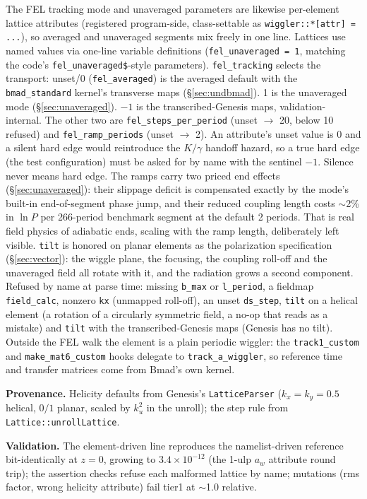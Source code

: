 \documentclass[11pt]{article}
\newcommand{\code}[1]{\texttt{#1}}
\newenvironment{provenance}{\par\small\textbf{Provenance.}}{\par}
\newenvironment{validation}{\par\small\textbf{Validation.}}{\par}
\begin{document}
The FEL tracking mode and unaveraged parameters are likewise per-element lattice
attributes (registered program-side, class-settable as
\code{wiggler::*[attr] = ...}), so averaged and unaveraged segments mix freely in one
line. Lattices use named values via one-line variable definitions
(\code{fel\_unaveraged = 1}, matching the code's \code{fel\_unaveraged\$}-style
parameters). \code{fel\_tracking} selects the transport: unset/0
(\code{fel\_averaged}) is the averaged
default with the
\code{bmad\_standard} kernel's transverse maps (\S\ref{sec:undbmad}). 1 is the
unaveraged mode (\S\ref{sec:unaveraged}). $-1$ is the transcribed-Genesis maps,
validation-internal. The other two are \code{fel\_steps\_per\_period} (unset $\to$ 20,
below 10 refused) and \code{fel\_ramp\_periods} (unset $\to$ 2). An attribute's unset
value
is 0 and a silent hard edge would reintroduce the $K/\gamma$ handoff hazard, so a
true hard edge (the test configuration) must be asked for by name with the
sentinel $-1$. Silence never means hard edge. The ramps carry two priced end
effects (\S\ref{sec:unaveraged}): their slippage deficit is compensated exactly by
the mode's built-in end-of-segment phase jump, and their reduced coupling length
costs $\sim$2\% in $\ln P$ per 266-period benchmark segment at the default 2
periods. That is real field physics of adiabatic ends, scaling with the ramp length,
deliberately left visible. \code{tilt} is honored on planar elements as the polarization specification
(\S\ref{sec:vector}): the wiggle plane, the focusing, the coupling roll-off and the
unaveraged field all rotate with it, and the radiation grows a second component.
Refused by name at parse time: missing \code{b\_max} or \code{l\_period}, a
fieldmap \code{field\_calc}, nonzero \code{kx} (unmapped roll-off), an unset
\code{ds\_step}, \code{tilt} on a helical element (a rotation of a circularly
symmetric field, a no-op that reads as a mistake) and \code{tilt} with the
transcribed-Genesis maps (Genesis has no tilt). Outside the FEL walk the element is a plain periodic wiggler: the
\code{track1\_custom} and \code{make\_mat6\_custom} hooks delegate to
\code{track\_a\_wiggler}, so reference time and transfer matrices come from Bmad's own
kernel.

\begin{provenance}
Helicity defaults from Genesis's \code{LatticeParser} ($k_x{=}k_y{=}0.5$ helical,
$0/1$ planar, scaled by $k_u^2$ in the unroll); the step rule from
\code{Lattice::unrollLattice}.
\end{provenance}
\begin{validation}
The element-driven line reproduces the namelist-driven reference bit-identically at
$z=0$, growing to $3.4\times10^{-12}$ (the 1-ulp $a_w$ attribute round trip); the
assertion checks refuse each malformed lattice by name; mutations (rms factor, wrong
helicity attribute) fail tier1 at $\sim$1.0 relative.
\end{validation}
\end{document}
